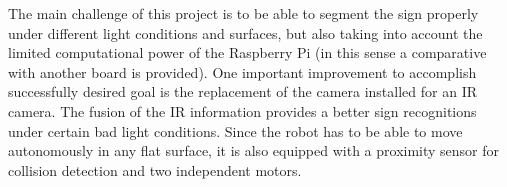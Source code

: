 The main challenge of this project is to be able to segment the sign properly under different light conditions and surfaces, but also taking into account the limited computational power of the Raspberry Pi (in this sense a comparative with another board is provided). One important improvement to accomplish successfully desired goal is the replacement of the camera installed for an IR camera. The fusion of the IR information provides a better sign recognitions under certain bad light conditions. Since the robot has to be able to move autonomously in any flat surface, it is also equipped with a proximity sensor for collision detection and two independent motors.